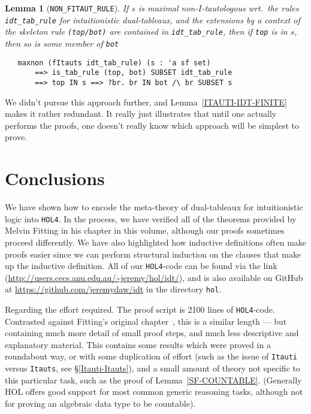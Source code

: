 \documentclass[a4paper]{article}
\newtheorem{lemma}{Lemma}
\newcommand{\hol}{\texttt{HOL4}}
\begin{document}
\begin{lemma}[\texttt{NON\_FITAUT\_RULE}]

  If $s$ is maximal non-$I$-tautologous wrt.\ the rules \texttt{idt\_tab\_rule}
  for intuitionistic dual-tableaux, 
  and the extensions by a context of the skeleton rule
  \texttt{(top/bot)} are contained
  in \texttt{idt\_tab\_rule}, then if \texttt{top} is in $s$,
  then so is some member of \texttt{bot} 

\begin{verbatim}
   maxnon (fItauts idt_tab_rule) (s : 'a sf set) 
       ==> is_tab_rule (top, bot) SUBSET idt_tab_rule 
       ==> top IN s ==> ?br. br IN bot /\ br SUBSET s
\end{verbatim}
\end{lemma}

We didn't pursue this approach further,
and Lemma~\ref{ITAUTI-IDT-FINITE} 
makes it rather redundant.
It really just illustrates that until one actually performs the proofs,
one doesn't really know which approach will be simplest to prove.

\section{Conclusions}

We have shown how to encode the meta-theory of dual-tableaux for
intuitionistic logic into \hol. In the process, we have verified all
of the theorems provided by Melvin Fitting in his chapter in this
volume, although our proofs sometimes proceed differently. We have
also highlighted how inductive definitions often make proofs easier
since we can perform structural induction on the clauses that make up
the inductive definition. All of our \hol-code
can be found via the link
(\url{http://users.cecs.anu.edu.au/~jeremy/hol/idt/}),
and is also available on GitHub at 
\url{https://github.com/jeremydaw/idt} in the directory \texttt{hol}.

Regarding the effort required. 
The proof script is {2100} lines of \hol-code.
Contrasted against Fitting's original
chapter~\cite{fitting-dual-tableau}, this is a similar length --- 
but containing much more detail of small proof steps, and much less descriptive
and explanatory material.
This contains some results which were proved in a roundabout way, or with
some duplication of effort (such as the issue of \texttt{Itauti} versus
\texttt{Itauts}, see \S\ref{Itauti-Itauts}),
and a small amount of theory not specific to this particular task,
such as the proof of Lemma~\ref{SF-COUNTABLE}.
(Generally HOL offers good support for most common generic reasoning tasks, 
although not for proving an algebraic data type to be countable).
\end{document}
